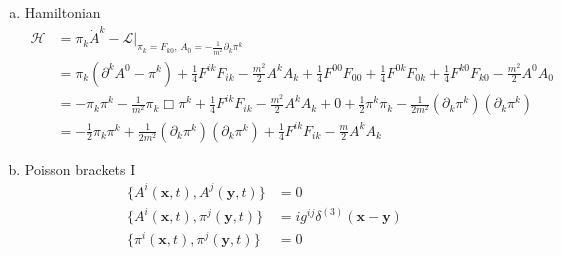 \documentclass[10pt,a4paper]{report}
\theoremstyle{definition}
\begin{document}
\begin{enumerate}[a)]
\item Hamiltonian
\begin{align}
\mathcal{H}
&=\pi_k\dot{A}^k-\mathcal{L}|_{\pi_k=F_{k0},\,A_0=-\frac{1}{m^2}\partial_k\pi^k}\\
&=\pi_k(\partial^kA^0-\pi^k)+\frac{1}{4}F^{ik}F_{ik}-\frac{m^2}{2}A^kA_k+\frac{1}{4}F^{00}F_{00}+\frac{1}{4}F^{0k}F_{0k}+\frac{1}{4}F^{k0}F_{k0}-\frac{m^2}{2}A^0A_0\\
&=-\pi_k\pi^k-\frac{1}{m^2}\pi_k\Box\pi^k+\frac{1}{4}F^{ik}F_{ik}-\frac{m^2}{2}A^kA_k+0+\frac{1}{2}\pi^k\pi_k-\frac{1}{2m^2}(\partial_k\pi^k)(\partial_k\pi^k)\\
&=-\frac{1}{2}\pi_k\pi^k+\frac{1}{2m^2}(\partial_k\pi^k)(\partial_k\pi^k)+\frac{1}{4}F^{ik}F_{ik}-\frac{m}{2}A^kA_k
\end{align}
\item Poisson brackets I
\begin{align}
\{A^i(\mathbf{x},t),A^j(\mathbf{y},t)\}&=0\\
\{A^i(\mathbf{x},t),\pi^j(\mathbf{y},t)\}&=ig^{ij}\delta^{(3)}(\mathbf{x}-\mathbf{y})\\
\{\pi^i(\mathbf{x},t),\pi^j(\mathbf{y},t)\}&=0
\end{align}


\end{enumerate}
\end{document}
